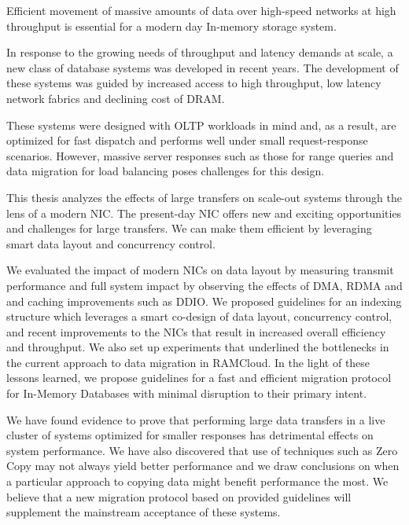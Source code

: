 


Efficient movement of massive amounts of data over high-speed networks at high 
throughput is essential for a modern day In-memory storage system.

In response to the growing needs of throughput and latency demands at scale, a new class of database systems was developed in recent years.
The development of these systems was guided by increased access to high throughput, low latency network fabrics and declining cost of DRAM.

These systems were designed with OLTP workloads in mind and, as a result, are optimized for fast dispatch and performs well under small
request-response scenarios. However, massive server responses such as those for range queries and data migration for load balancing poses challenges for this design.  

This thesis analyzes the effects of large transfers on scale-out systems through the lens of a modern NIC.
The present-day NIC offers new and exciting opportunities and challenges for large transfers.
We can make them efficient by leveraging smart data layout and concurrency control.

We evaluated the impact of modern NICs on data layout by measuring transmit performance and full system impact by observing the effects of DMA, RDMA and and caching improvements such as DDIO. 
We proposed guidelines for an indexing structure which leverages a smart co-design of data layout, concurrency control, and recent improvements to the NICs that result in increased overall efficiency and throughput. 
We also set up experiments that underlined the bottlenecks in the current approach to data migration in RAMCloud.
In the light of these lessons learned, we propose guidelines for a fast and efficient migration protocol for In-Memory Databases with minimal disruption to their primary intent.

We have found evidence to prove that performing large data transfers in a live cluster of systems optimized for smaller responses has detrimental effects on system performance. 
We have also discovered that use of techniques such as Zero Copy may not always yield better performance and we draw conclusions on when a particular approach to copying data might benefit performance the most. 
We believe that a new migration protocol based on provided guidelines will supplement the mainstream acceptance of these systems.